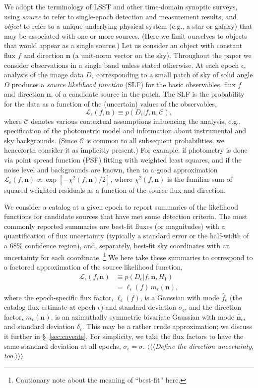 \documentclass[twocolumn]{emulateapj}
\newcommand{\ctxt}{\mathcal{C}}  %
\newcommand{\eind}{\epsilon}  %
\newcommand{\edata}{D_\eind}  %
\newcommand{\like}{\mathcal{L}}  %
\newcommand{\flike}{\ell}  %
\newcommand{\dlike}{m}  %
\newcommand{\flux}{f}
\newcommand{\fest}{\hat{\flux}}  %
\newcommand{\fsig}{\sigma}  %
\newcommand{\drxn}{\mathbf{n}}
\newcommand{\dest}{\hat{\mathbf{n}}}  %
\newcommand{\dsig}{\delta}  %
\newcommand\enote[1]{ %
\marginpar[\raggedleft\large $\blacktriangleright$]%
{\raggedright\large $\blacktriangleleft$} %
{\large $\langle\langle\langle$}{\sl #1}{\large  $\rangle\rangle\rangle$} %
}
\begin{document}
We adopt the terminology of LSST and other time-domain synoptic surveys, using \emph{source} to refer to single-epoch detection and measurement results, and \emph{object} to refer to a unique underlying physical system (e.g., a star or galaxy) that may be associated with one or more sources.
(Here we limit ourselves to objects that would appear as a single source.)
Let us consider an object with constant flux $f$ and direction $\drxn$ (a unit-norm vector on the sky). 
Throughout the paper we consider observations in a single band unless stated otherwise.
At each epoch $\eind$, analysis of the image data $\edata$ corresponding to a small patch of sky of solid angle $\Omega$ produces a \emph{source likelihood function} (SLF) for the basic observables, flux $\flux$ and direction $\drxn$, of a candidate source in the patch.
The SLF is the probability for the data as a function of the (uncertain) values of the observables,
\begin{equation}
\like_\eind(\flux,\drxn) \equiv p(\edata|\flux,\drxn,\ctxt),
\label{like-def}
\end{equation}
where $\ctxt$ denotes various contextual assumptions influencing the analysis,
e.g., specification of the photometric model and information about instrumental and sky backgrounds.
(Since $\ctxt$ is common to all subsequent probabilities, we henceforth consider it as implicitly present.)
For example, if photometry is done via point spread function (PSF) fitting with weighted least squares, and if the noise level and backgrounds are known, then to a good approximation $\like_\eind(\flux,\drxn) \propto \exp[-\chi^2(\flux, \drxn)/2]$, where $\chi^2(\flux, \drxn)$ is the familiar sum of squared weighted residuals as a function of the source flux and direction.


We consider a catalog at a given epoch to report summaries of the likelihood functions for candidate sources that have met some detection criteria.
The most commonly reported summaries are best-fit fluxes (or magnitudes) with a quantification of flux uncertainty (typically a standard error or the half-width of a 68\% confidence region), and, separately, best-fit sky coordinates with an uncertainty for each coordinate.%
\footnote{Cautionary note about the meaning of ``best-fit'' here.}
We here take these summaries to correspond to a factored approximation of the source likelihood function,
\begin{align} \label{eq:eplike}
\like_\eind(\flux, \drxn)
  &\equiv p(\edata|\flux, \drxn, H_1)\nonumber\\
  &= \flike_\eind(\flux)\, \dlike_\eind(\drxn),
\end{align}
where the epoch-specific flux factor, $\flike_\eind(\flux)$, is a Gaussian with mode $\fest_\eind$ (the catalog flux estimate at epoch $\eind$) and standard deviation $\fsig_\eind$, and the direction factor, $\dlike_\eind(\drxn)$, is an azimuthally symmetric bivariate Gaussian with mode $\dest_\eind$, and standard deviation $\dsig_\eind$.
This may be a rather crude approximation; we discuss it further in \S~\ref{sec:caveats}.
For simplicity, we take the flux factors to have the same standard deviation at all epochs,  $\fsig_\eind = \sigma$.
\enote{Define the direction uncertainty, too.}
\end{document}
